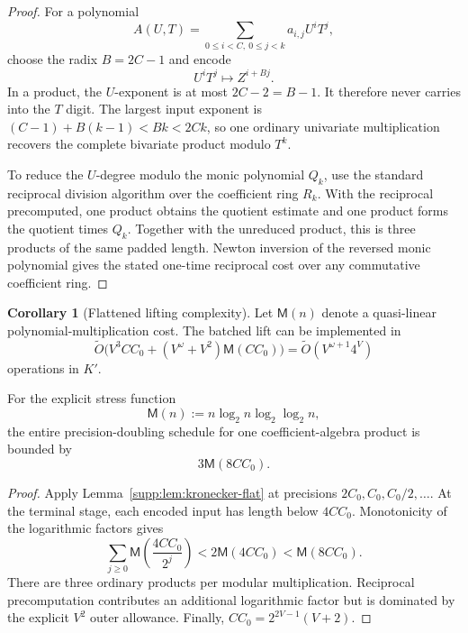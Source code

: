 \documentclass[11pt,a4paper]{article}
\theoremstyle{definition}
\newtheorem{corollary}[theorem]{Corollary}
\theoremstyle{remark}
\newcommand{\softO}{\widetilde O}
\newcommand{\Mmul}{\mathsf M}
\begin{document}
\begin{proof}
For a polynomial
\[
 A(U,T)=\sum_{0\le i<C,\ 0\le j<k}a_{i,j}U^iT^j,
\]
choose the radix $B=2C-1$ and encode
\begin{equation}\label{supp:eq:kronecker-map}
 U^iT^j\longmapsto Z^{i+Bj}.
\end{equation}
In a product, the $U$-exponent is at most $2C-2=B-1$.  It therefore never carries into the $T$ digit.  The largest input exponent is
$(C-1)+B(k-1)<Bk<2Ck$, so one ordinary univariate multiplication recovers the complete bivariate product modulo $T^k$.

To reduce the $U$-degree modulo the monic polynomial $Q_k$, use the standard reciprocal division algorithm over the coefficient ring $R_k$.  With the reciprocal precomputed, one product obtains the quotient estimate and one product forms the quotient times $Q_k$.  Together with the unreduced product, this is three products of the same padded length.  Newton inversion of the reversed monic polynomial gives the stated one-time reciprocal cost over any commutative coefficient ring.
\end{proof}

\begin{corollary}[Flattened lifting complexity]\label{supp:cor:flattened-lifting}
Let $\Mmul(n)$ denote a quasi-linear polynomial-multiplication cost.  The batched lift can be implemented in
\begin{equation}\label{supp:eq:flattened-asymptotic}
 \softO\bigl(V^3CC_0+(V^\omega+V^2)\Mmul(CC_0)\bigr)
 =\softO(V^{\omega+1}4^V)
\end{equation}
operations in $K'$.

For the explicit stress function
\begin{equation}\label{supp:eq:M-explicit}
 \Mmul(n):=n\log_2n\log_2\log_2n,
\end{equation}
the entire precision-doubling schedule for one coefficient-algebra product is bounded by
\begin{equation}\label{supp:eq:flat-schedule-bound}
 3\Mmul(8CC_0).
\end{equation}
\end{corollary}

\begin{proof}
Apply Lemma~\ref{supp:lem:kronecker-flat} at precisions
$2C_0,C_0,C_0/2,\ldots$.  At the terminal stage, each encoded input has length below $4CC_0$.  Monotonicity of the logarithmic factors gives
\[
 \sum_{j\ge0}\Mmul\!\left(\frac{4CC_0}{2^j}\right)
 <2\Mmul(4CC_0)
 <\Mmul(8CC_0).
\]
There are three ordinary products per modular multiplication.  Reciprocal precomputation contributes an additional logarithmic factor but is dominated by the explicit $V^2$ outer allowance.  Finally, $CC_0=2^{2V-1}(V+2)$.
\end{proof}
\end{document}
